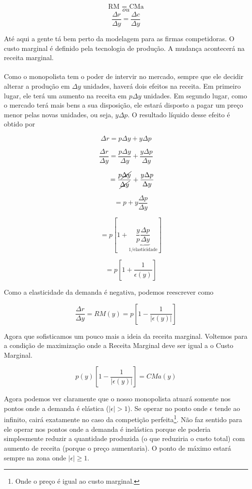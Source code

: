\documentclass[a4paper,11pt,oneside]{book}
\theoremstyle{definition}
\theoremstyle{break}
\begin{document}
$$ \textrm{RM = CMa} $$
$$ ou $$
$$ \frac{\Delta r}{\Delta y} = \frac{\Delta c}{\Delta y} $$

Até aqui a gente tá bem perto da modelagem para as firmas competidoras. O custo marginal é definido pela tecnologia de produção. A mudança acontecerá na receita marginal.
\\~\\
Como o monopolista tem o poder de intervir no mercado, sempre que ele decidir alterar a produção em $\Delta y$ unidades, haverá dois efeitos na receita. Em primeiro lugar, ele terá um aumento na receita em $p\Delta y$ unidades. Em segundo lugar, como o mercado terá mais bens a sua disposição, ele estará disposto a pagar um preço menor pelas novas unidades, ou seja, $y\Delta p$. O resultado líquido desse efeito é obtido por

$$\Delta r = p \Delta y + y \Delta p$$

$$ \frac{\Delta r}{\Delta y} = 
\frac{p \Delta y}{\Delta y} + 
\frac{y \Delta p}{\Delta y} $$

$$ \phantom{\frac{\Delta r}{\Delta y}} = 
\frac{p \cancel{\Delta y}}{\cancel{\Delta y}} + 
\frac{y \Delta p}{\Delta y} $$

$$ \phantom{\frac{\Delta r}{\Delta y}} = p + y\frac{\Delta p}{\Delta y} $$

$$ \phantom{\frac{\Delta r}{\Delta y}} = 
p \left[ 1 + \underbrace{\frac{y}{p}\frac{\Delta p}{\Delta y}}_\text{1/elasticidade} \right] $$

$$ \phantom{\frac{\Delta r}{\Delta y}} = 
p \left[ 1 + \frac{1}{\epsilon(y)} \right] $$

Como a elasticidade da demanda é negativa, podemos reescrever como

$$ \frac{\Delta r}{\Delta y} = 
RM(y) =
p \left[ 1 - \frac{1}{|\epsilon(y)|} \right] $$

Agora que sofisticamos um pouco mais a ideia da receita marginal. Voltemos para a condição de maximização onde a Receita Marginal deve ser igual a o Custo Marginal.

$$ p(y) \left[ 1 - \frac{1}{|\epsilon(y)|} \right] = CMa(y) $$

Agora podemos ver claramente que o nosso monopolista atuará somente nos pontos onde a demanda é elástica ($|\epsilon| > 1$). Se operar no ponto onde $\epsilon$ tende ao infinito, cairá exatamente no caso da competição perfeita\footnote{Onde o preço é igual ao custo marginal.}. Não faz sentido para ele operar nos pontos onde a demanda é inelástica porque ele poderia simplesmente reduzir a quantidade produzida (o que reduziria o custo total) com aumento de receita (porque o preço aumentaria). O ponto de máximo estará sempre na zona onde $|\epsilon| \geq 1$.
\end{document}
